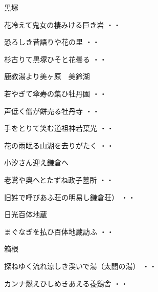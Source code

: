 \vspace{ 0.4cm}
黒塚
\begin{shiika}花冷えて鬼女の棲みける巨き岩
\hfill{・・}\end{shiika}
\begin{shiika}恐ろしき昔語りや花の里
\hfill{・・}\end{shiika}
\begin{shiika}杉古りて黒塚ひそと花曇る
\hfill{・・}\end{shiika}
\vspace{ 0.4cm}
鹿教湯より美ヶ原　美鈴湖
\begin{shiika}若やぎて傘寿の集ひ牡丹園
\hfill{・・}\end{shiika}
\begin{shiika}声低く僧が餅売る牡丹寺
\hfill{・・}\end{shiika}
\begin{shiika}手をとりて笑む道祖神若葉光
\hfill{・・}\end{shiika}
\begin{shiika}花の雨眠る山湖を去りがたく
\hfill{・・}\end{shiika}
\vspace{ 0.4cm}
小汐さん迎え鎌倉へ
\begin{shiika}老鴬や奥へとたずね政子墓所
\hfill{・・}\end{shiika}
\vspace{ 0.4cm}
\begin{shiika}旧姓で呼びあふ荘の明易し鎌倉荘）
\hfill{・・}\end{shiika}
\vspace{ 0.4cm}
日光百体地蔵
\begin{shiika}まぐなぎを払ひ百体地蔵訪ふ
\hfill{・・}\end{shiika}
\vspace{ 0.4cm}
箱根
\begin{shiika}探ねゆく流れ涼しき渓いで湯（太閤の湯）
\hfill{・・}\end{shiika}
\begin{shiika}カンナ燃えひしめきあえる養鶏舎
\hfill{・・}\end{shiika}
